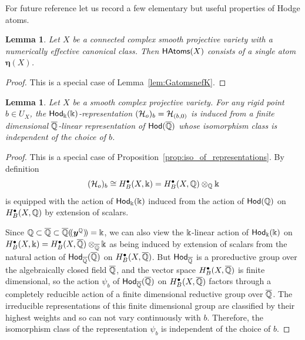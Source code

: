 \documentclass[twoside,leqno]{article}
\numberwithin{equation}{section}
\theoremstyle{plain}
\newtheorem{lemma}[equation]{Lemma}
\theoremstyle{definition}
\begin{document}
For future reference let us record a few elementary but useful properties of Hodge atoms.

\begin{lemma} \label{lem:nefK}
Let $X$ be a connected complex smooth projective variety with a numerically effective canonical class.
Then $\mathsf{HAtoms}(X)$ consists of a single atom
$\boldsymbol{\eta}(X)$.
\end{lemma}
\begin{proof}
This is a special case of Lemma~\ref{lem:GatomsnefK}.
\end{proof}

\begin{lemma} \label{lem:acindependence} Let $X$ be a smooth complex projective variety.
  For any rigid point $b \in U_{X}$, the $\mathsf{Hod}_{\Bbbk}(\Bbbk)$-representation $(\mathcal H_{o})_b = \mathcal H_{(b,0)}$ is induced from a finite dimensional $\overline{\mathbb Q}$-linear representation of $\mathsf{Hod}(\overline{\mathbb Q})$ whose isomorphism class is independent of the choice of $b$.
\end{lemma}
\begin{proof}
This is a special case of Proposition~\ref{prop:iso_of_representations}. By definition 
\[
(\mathcal H_{o})_b \cong H^{\bullet}_{B}(X,\Bbbk) = H^{\bullet}_{B}(X,\mathbb Q)\otimes_{\mathbb Q} \Bbbk
\]
is equipped with the action of $\mathsf{Hod}_{\Bbbk}(\Bbbk)$ induced from the action of $\mathsf{Hod}(\mathbb Q)$ on $H^{\bullet}_{B}(X,\mathbb Q)$ by extension of scalars. 

Since $\mathbb Q \subset \overline{\mathbb Q} \subset \overline{\mathbb Q}(\!(\boldsymbol{y}^{\mathbb Q})\!) = \Bbbk$,
we  can also view the $\Bbbk$-linear action of $\mathsf{Hod}_{\Bbbk}(\Bbbk)$ on 
$H^{\bullet}_{B}(X,\Bbbk) = H^{\bullet}_{B}(X,\overline{\mathbb Q})\otimes_{\overline{\mathbb Q}} \Bbbk$
as being induced by extension of scalars from the natural action of $\mathsf{Hod}_{\overline{\mathbb Q}}(\overline{\mathbb Q})$ on $H^{\bullet}_{B}(X,\overline{\mathbb Q})$.
But $\mathsf{Hod}_{\overline{\mathbb Q}}$  is a proreductive group over the  algebraically closed field $\overline{\mathbb Q}$, and the vector space 
$H^{\bullet}_{B}(X,\overline{\mathbb Q})$ is finite dimensional, so 
the action $\psi_{b}$ of $\mathsf{Hod}_{\overline{\mathbb Q}}(\overline{\mathbb Q})$ on $H^{\bullet}_{B}(X,\overline{\mathbb Q})$ factors through a completely reducible action of a finite dimensional reductive group over $\overline{\mathbb Q}$. The irreducible representations of this finite dimensional group are classified by their highest weights and so can not vary continuously with $b$.
  Therefore, the isomorphism class of the representation $\psi_{b}$ is independent of the choice of $b$.
\end{proof}
\end{document}
